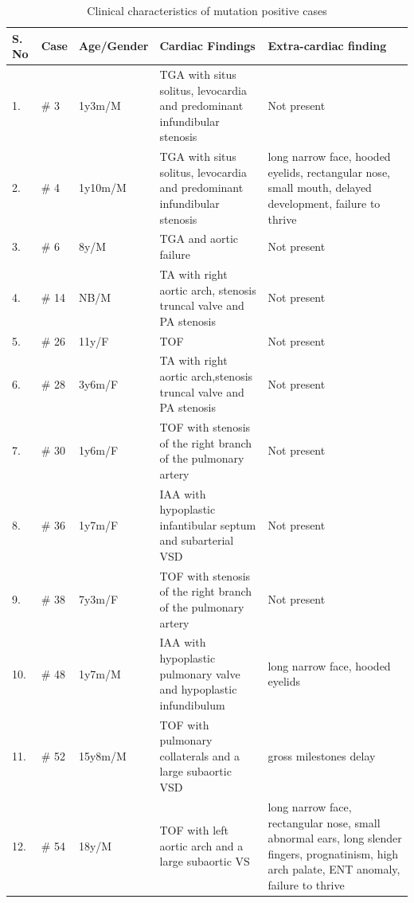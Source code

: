 \begin{refsection}
\begin{landscape}
\begin{spacing}{1}
\begin{longtable}{p{0.5in} p{0.5in} p{1in} p{3in} p{3in}}

\caption{Clinical characteristics of mutation positive cases}\\

           \toprule
          \textbf{S. No}
        & \textbf{Case}
        & \textbf{Age/Gender}
        & \textbf{Cardiac Findings}
        & \textbf{Extra-cardiac finding}
        \\* \toprule
	\endhead
 \label{tab:clinchar}  
   	
	1.  & \# 3 & 1y3m/M & TGA with situs solitus, levocardia and predominant infundibular stenosis & Not present \\ \midrule
	2.  & \# 4 & 1y10m/M & TGA with situs solitus, levocardia and predominant infundibular stenosis & long narrow face, hooded eyelids, rectangular nose, small mouth, delayed development, failure to thrive \\ \midrule
	3.  & \# 6 & 8y/M & TGA and aortic failure  & Not present \\ \midrule
	4.  & \# 14 & NB/M & TA with right aortic arch, stenosis truncal valve and PA stenosis & Not present \\ \midrule
	5.  & \# 26 & 11y/F & TOF & Not present \\ \midrule
	6.  & \# 28 & 3y6m/F & TA with right aortic arch,stenosis truncal valve and PA stenosis & Not present \\ \midrule
	7.  & \# 30 & 1y6m/F & TOF with stenosis of the right branch of the pulmonary artery & Not present \\ \midrule
	8.  & \# 36 & 1y7m/F & IAA with hypoplastic infantibular septum and subarterial VSD & Not present \\ \midrule
	9.  & \# 38 & 7y3m/F & TOF with stenosis of the right branch of the pulmonary artery & Not present \\ \midrule
	10.  & \# 48 & 1y7m/M & IAA with hypoplastic pulmonary valve and hypoplastic infundibulum & long narrow face, hooded eyelids \\ \midrule
	11.  & \# 52 & 15y8m/M & TOF with pulmonary collaterals and a large subaortic VSD & gross milestones delay \\ \midrule
	12.  & \# 54 & 18y/M & TOF with left aortic arch and a large subaortic VS & long narrow face, rectangular nose, small abnormal ears, long slender fingers, prognatinism, high arch palate, ENT anomaly, failure to thrive \\ \midrule

\end{longtable}
\end{spacing}
\end{landscape}
\end{refsection}
